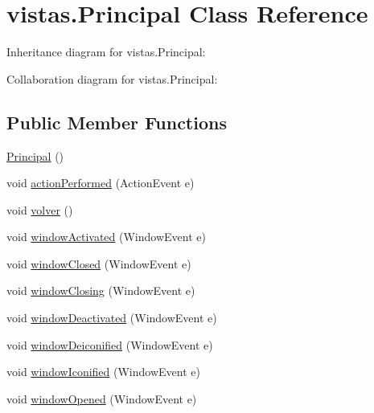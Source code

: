 \hypertarget{classvistas_1_1_principal}{}\section{vistas.\+Principal Class Reference}
\label{classvistas_1_1_principal}


Inheritance diagram for vistas.\+Principal\+:


Collaboration diagram for vistas.\+Principal\+:
\subsection*{Public Member Functions}
\begin{DoxyCompactItemize}
\item 
\mbox{\hyperlink{classvistas_1_1_principal_acf014fac1f15c33d980e722fe1e6d58f}{Principal}} ()
\item 
void \mbox{\hyperlink{classvistas_1_1_principal_a8371dc6a7768c2ec5afae9d2b266b139}{action\+Performed}} (Action\+Event e)
\item 
void \mbox{\hyperlink{classvistas_1_1_principal_ae8d4c8bb777f2af665a09be522ab1d81}{volver}} ()
\item 
void \mbox{\hyperlink{classvistas_1_1_principal_ade8818ac65f00c97240312f078fec2b0}{window\+Activated}} (Window\+Event e)
\item 
void \mbox{\hyperlink{classvistas_1_1_principal_a295e5c1a87bcd4b888c76aa346aaff12}{window\+Closed}} (Window\+Event e)
\item 
void \mbox{\hyperlink{classvistas_1_1_principal_a03d69d2a4a326d8d8d38434760faec6b}{window\+Closing}} (Window\+Event e)
\item 
void \mbox{\hyperlink{classvistas_1_1_principal_af96847312824430497ac7d76172f225f}{window\+Deactivated}} (Window\+Event e)
\item 
void \mbox{\hyperlink{classvistas_1_1_principal_aa086518578aefe569dc44287436df8d7}{window\+Deiconified}} (Window\+Event e)
\item 
void \mbox{\hyperlink{classvistas_1_1_principal_a2b6ea36288842cb398771591cc7b7b92}{window\+Iconified}} (Window\+Event e)
\item 
void \mbox{\hyperlink{classvistas_1_1_principal_adad5c3a92bd295ce50b2f66aceaa8524}{window\+Opened}} (Window\+Event e)
\end{DoxyCompactItemize}
